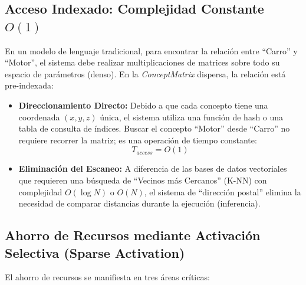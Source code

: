 \documentclass[12pt]{article}
\begin{document}
\subsection{Acceso Indexado: Complejidad Constante $O(1)$}
En un modelo de lenguaje tradicional, para encontrar la relación entre ``Carro'' y ``Motor'', el sistema debe realizar multiplicaciones de matrices sobre todo su espacio de parámetros (denso). En la \textit{ConceptMatrix} dispersa, la relación está pre-indexada:

\begin{itemize}
    \item \textbf{Direccionamiento Directo:} Debido a que cada concepto tiene una coordenada $(x, y, z)$ única, el sistema utiliza una función de hash o una tabla de consulta de índices. Buscar el concepto ``Motor'' desde ``Carro'' no requiere recorrer la matriz; es una operación de tiempo constante:
    \[ T_{access} = O(1) \]
    \item \textbf{Eliminación del Escaneo:} A diferencia de las bases de datos vectoriales que requieren una búsqueda de ``Vecinos más Cercanos'' (K-NN) con complejidad $O(\log N)$ o $O(N)$, el sistema de ``dirección postal'' elimina la necesidad de comparar distancias durante la ejecución (inferencia).
\end{itemize}



\subsection{Ahorro de Recursos mediante Activación Selectiva (Sparse Activation)}
El ahorro de recursos se manifiesta en tres áreas críticas:
\end{document}
